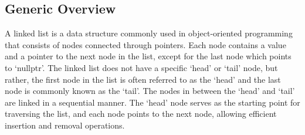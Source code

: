 \documentclass[a4paper,9pt]{article}
\begin{document}
\subsection*{Generic Overview}

A linked list is a data structure commonly used in object-oriented programming that consists of nodes connected through 
pointers. Each node contains a value and a pointer to the next node in the list, except for the last node which points 
to `nullptr'. The linked list does not have a specific `head' or `tail' node, but rather, the first node in the list is 
often referred to as the `head' and the last node is commonly known as the `tail'. The nodes in between the `head' and 
`tail' are linked in a sequential manner. The `head' node serves as the starting point for traversing the list, and each 
node points to the next node, allowing efficient insertion and removal operations.
\end{document}
